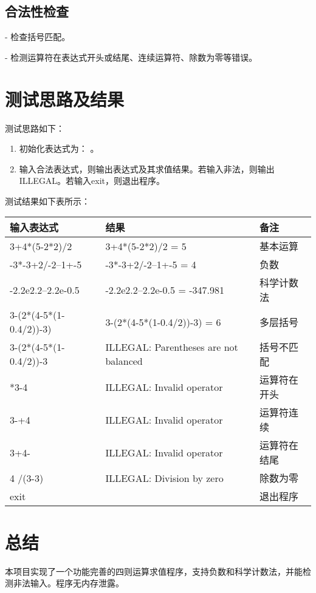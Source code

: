 \documentclass[UTF8]{ctexart}
\begin{document}
\subsection{合法性检查}
- 检查括号匹配。 

- 检测运算符在表达式开头或结尾、连续运算符、除数为零等错误。  

\section{测试思路及结果}
测试思路如下：
\begin{enumerate}
    \item 初始化表达式为： 。
    \item 输入合法表达式，则输出表达式及其求值结果。若输入非法，则输出ILLEGAL。若输入exit，则退出程序。
\end{enumerate}

测试结果如下表所示：

\bigskip

\begin{tabular}{|l|l|l|}
\hline
\textbf{输入表达式} & \textbf{结果} & \textbf{备注}    \\ \hline
3+4*(5-2*2)/2        & 3+4*(5-2*2)/2 = 5          & 基本运算      \\ \hline
-3*-3+2/-2--1+-5                & -3*-3+2/-2--1+-5 = 4       & 负数      \\ \hline
-2.2e2.2--2.2e-0.5               & -2.2e2.2--2.2e-0.5 = -347.981           & 科学计数法    \\ \hline
3-(2*(4-5*(1-0.4/2))-3)        & 3-(2*(4-5*(1-0.4/2))-3) = 6  & 多层括号    \\  \hline
3-(2*(4-5*(1-0.4/2))-3        & ILLEGAL: Parentheses are not balanced   & 括号不匹配   \\ \hline
*3-4   &ILLEGAL: Invalid operator & 运算符在开头 \\ \hline
3-+4   &ILLEGAL: Invalid operator   & 运算符连续 \\ \hline
3+4-   &ILLEGAL: Invalid operator   & 运算符在结尾 \\ \hline
4 /(3-3)  &ILLEGAL: Division by zero   & 除数为零 \\ \hline
exit &    & 退出程序 \\ \hline
\end{tabular}
\section{总结}
本项目实现了一个功能完善的四则运算求值程序，支持负数和科学计数法，并能检测非法输入。程序无内存泄露。
\end{document}
